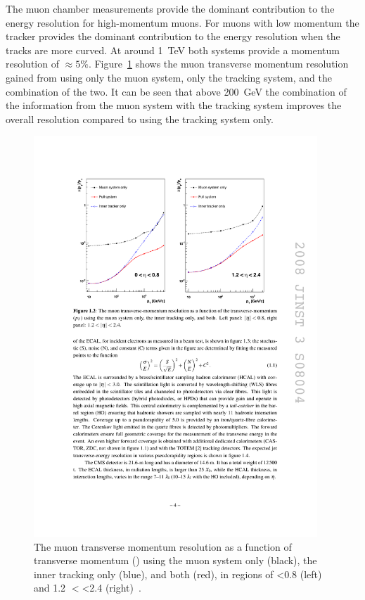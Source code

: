 The muon chamber measurements provide the dominant contribution to the energy resolution for high-momentum muons. For muons with low momentum the tracker provides the dominant contribution to the energy resolution when the tracks are more curved. At around 1~TeV both systems provide a momentum resolution of $\approx5\%$. Figure~\ref{fig:muonres} shows the muon transverse momentum resolution gained from using only the muon system, only the tracking system, and the combination of the two. It can be seen that above 200~GeV the combination of the information from the muon system with the tracking system improves the overall resolution compared to using the tracking system only.
\begin{figure}[ht!]
\centering
    \includegraphics[width=0.95\textwidth]{images/muon_resolution.pdf}
    \caption{The muon transverse momentum resolution as a function of transverse momentum (\pt) using the muon system only (black), the inner tracking only
  (blue), and both (red), in regions of \abs\eta \num{<0.8} (left) and \num{1.2} $<$\abs\eta\num{<2.4} (right)~\cite{1748-0221-3-08-S08004}.}
    \label{fig:muonres}
\end{figure}


